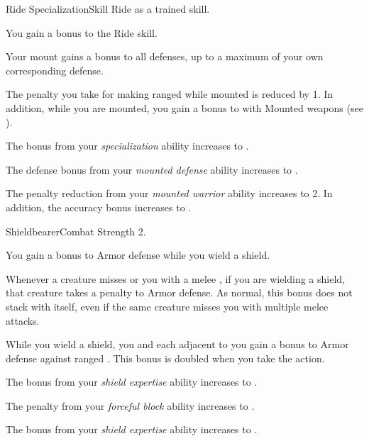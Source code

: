     \begin{feat}{Ride Specialization}{Skill}
        \featpre Ride as a trained skill.

         You gain a  bonus to the Ride skill.

         Your mount gains a  bonus to all defenses, up to a maximum of your own corresponding defense.

         The penalty you take for making ranged  while mounted is reduced by 1.
        In addition, while you are mounted, you gain a  bonus to  with Mounted weapons (see ).

         The bonus from your \textit{specialization} ability increases to .

         The defense bonus from your \textit{mounted defense} ability increases to .

         The penalty reduction from your \textit{mounted warrior} ability increases to 2.
        In addition, the accuracy bonus increases to .
    \end{feat}

    \begin{feat}{Shieldbearer}{Combat}
        \featpre Strength 2.

         You gain a  bonus to Armor defense while you wield a shield.

         Whenever a creature misses or  you with a melee , if you are wielding a shield, that creature  takes a  penalty to Armor defense.
        As normal, this bonus does not stack with itself, even if the same creature misses you with multiple melee attacks.

         While you wield a shield, you and each  adjacent to you gain a  bonus to Armor defense against ranged .
        This bonus is doubled when you take the  action.

         The bonus from your \textit{shield expertise} ability increases to .

         The penalty from your \textit{forceful block} ability increases to .

         The bonus from your \textit{shield expertise} ability increases to .
    \end{feat}

